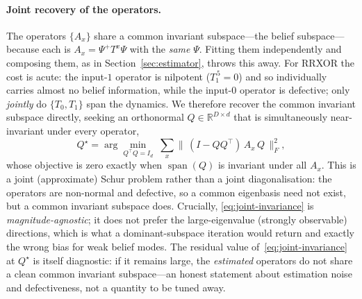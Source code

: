\documentclass[11pt]{article}
\begin{document}
\paragraph{Joint recovery of the operators.}
The operators $\{A_x\}$ share a common invariant subspace---the belief subspace---because
each is $A_x=\Psi^{+}T^x\Psi$ with the \emph{same} $\Psi$. Fitting them independently and
composing them, as in Section~\ref{sec:estimator}, throws this away. For RRXOR the cost is
acute: the input-$1$ operator is nilpotent ($T_1^{\,5}=0$) and so individually carries almost
no belief information, while the input-$0$ operator is defective; only \emph{jointly} do
$\{T_0,T_1\}$ span the dynamics. We therefore recover the common invariant subspace directly,
seeking an orthonormal $Q\in\mathbb R^{D\times d}$ that is simultaneously near-invariant under
every operator,
\begin{equation}
Q^\star=\arg\min_{Q^\top Q=I_d}\;
\sum_{x}\bigl\|\,(I-QQ^{\!\top})\,A_x\,Q\,\bigr\|_F^{2},
\label{eq:joint-invariance}
\end{equation}
whose objective is zero exactly when $\operatorname{span}(Q)$ is invariant under all $A_x$.
This is a joint (approximate) Schur problem rather than a joint diagonalisation: the
operators are non-normal and defective, so a common eigenbasis need not exist, but a common
invariant subspace does. Crucially, \eqref{eq:joint-invariance} is \emph{magnitude-agnostic};
it does not prefer the large-eigenvalue (strongly observable) directions, which is what a
dominant-subspace iteration would return and exactly the wrong bias for weak belief modes.
The residual value of~\eqref{eq:joint-invariance} at $Q^\star$ is itself diagnostic: if it
remains large, the \emph{estimated} operators do not share a clean common invariant
subspace---an honest statement about estimation noise and defectiveness, not a quantity to be
tuned away.
\end{document}
